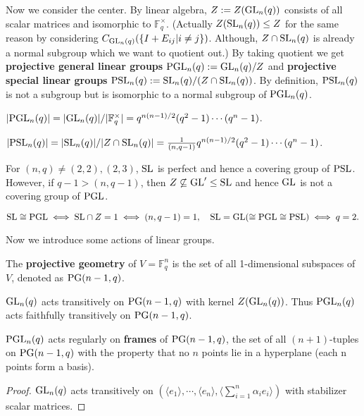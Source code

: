 \documentclass[a4paper,11pt]{article}
\begin{document}
Now we consider the center. By linear algebra, $Z:=Z(\mathrm{GL}_n(q))$ consists of all scalar matrices and isomorphic to $\mathbb{F}_q^\times$. (Actually $Z(\mathrm{SL}_n(q))\leq Z$ for the same reason by considering $C_{\mathrm{GL}_n(q)}(\{ I+E_{ij}|i\neq j\})$. Although, $Z\cap\mathrm{SL}_n(q)$ is already a normal subgroup which we want to quotient out.) By taking quotient we get \textbf{projective general linear groups} $\mathrm{PGL}_n(q):=\mathrm{GL}_n(q)/Z$ and \textbf{projective special linear groups} $\mathrm{PSL}_n(q):=\mathrm{SL}_n(q)/(Z\cap\mathrm{SL}_n(q))$. By definition, $\mathrm{PSL}_n(q)$ is not a subgroup but is isomorphic to a normal subgroup of $\mathrm{PGL}_n(q)$.

\begin{remark}
    $|\mathrm{PGL}_n(q)|=|\mathrm{GL}_n(q)|/|\mathbb{F}_q^\times|=q^{n(n-1)/2}(q^2-1)\cdots(q^n-1)$.

    $|\mathrm{PSL}_n(q)|=|\mathrm{SL}_n(q)|/|Z\cap \mathrm{SL}_n(q)|=\frac{1}{(n,q-1)}q^{n(n-1)/2}(q^2-1)\cdots(q^n-1)$.
\end{remark}

\begin{remark}
    For $(n,q)\neq (2,2),(2,3)$, $\mathrm{SL}$ is perfect and hence a covering group of $\mathrm{PSL}$. However, if $q-1>(n,q-1)$, then $Z\not\subseteq \mathrm{GL}'\leq \mathrm{SL}$ and hence $\mathrm{GL}$ is not a covering group of $\mathrm{PGL}$.
\end{remark}

\begin{proposition}
    \[\mathrm{SL}\cong \mathrm{PGL}\iff \mathrm{SL}\cap Z=1 \iff (n,q-1)=1,\quad\mathrm{SL}=\mathrm{GL}(\cong\mathrm{PGL}\cong\mathrm{PSL}) \iff q=2.\]
\end{proposition}

Now we introduce some actions of linear groups.

\begin{definition}
    The \textbf{projective geometry} of $V=\mathbb{F}_q^n$ is the set of all 1-dimensional subspaces of $V$, denoted as $\mathrm{PG}(n-1,q)$.
\end{definition}

\begin{proposition}
    $\mathrm{GL}_n(q)$ acts transitively on $\mathrm{PG}(n-1,q)$ with kernel $Z(\mathrm{GL}_n(q))$. Thus $\mathrm{PGL}_n(q)$ acts faithfully transitively on $\mathrm{PG}(n-1,q)$. 
\end{proposition}


\begin{proposition}
    $\mathrm{PGL}_n(q)$ acts regularly on \textbf{frames} of $\mathrm{PG}(n-1,q)$, the set of all $(n+1)$-tuples on $\mathrm{PG}(n-1,q)$ with the property that no $n$ points lie in a hyperplane (each n points form a basis).
\end{proposition}
\begin{proof}
    $\mathrm{GL}_n(q)$ acts transitively on $(\langle e_1\rangle,\cdots,\langle e_n\rangle,\langle \sum_{i=1}^n \alpha_i e_i\rangle)$ with stabilizer scalar matrices.
\end{proof}
\end{document}

